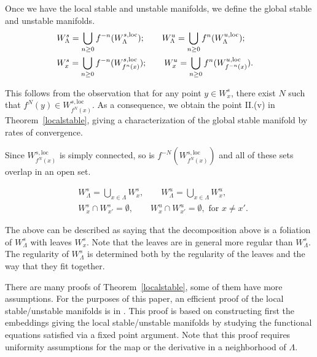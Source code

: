 \documentclass[11pt]{amsart}
\theoremstyle{definition}
\theoremstyle{remark}
\numberwithin{equation}{section}
\begin{document}
Once  we have the local stable and unstable manifolds,
we define the global stable and unstable manifolds.
\[
\begin{split}
  &W^s_\Lambda = \bigcup_{n \ge 0}  f^{-n}(W^{s,\textrm{loc}}_\Lambda);  \qquad
  W^u_\Lambda = \bigcup_{n \ge 0}  f^{n}(W^{u,\textrm{loc}}_\Lambda);  \qquad \\
  &W^s_x  = \bigcup_{n \ge 0}  f^{-n}(W^{s,\rm{\textrm{loc}}}_{f^n(x)});  \qquad
  W^u_x  = \bigcup_{n \ge 0}  f^{n}(W^{u,\rm{\textrm{loc}}}_{f^{-n}(x)}).
\end{split}
\]

This follows from the observation
that for any point $y \in W^s_x$, there exist $N$ such
that
$f^N(y) \in W^{s, \textrm{loc}}_{f^N (x)}$.
As a consequence, we obtain the point II.(v) in
Theorem~\ref{localstable}, giving a characterization
of the global stable manifold by rates of convergence.



Since $W^{s, \textrm{loc}}_{f^N(x)}$
is simply connected, so is $f^{-N}(W^{s, \textrm{loc}}_{f^N(x)} )$
and all of these sets overlap in an open set.



\[
\begin{split}
  &W^s_\Lambda = \bigcup_{x\in\Lambda}   W^{s}_x,  \qquad
  W^u_\Lambda = \bigcup_{x\in\Lambda}   W^{u}_x, \qquad \\
  &W^s_x\cap W^s_{x'}=\emptyset ,  \qquad
  W^u_x\cap W^u_{x'}=\emptyset , \textrm{ for } x\neq x'.
\end{split}
\]



The above can be described as saying that the
decomposition above is a foliation of $W^s_\Lambda$
with leaves $W^s_x$. Note that the leaves are in general
more regular than $W^s_\Lambda$.
The regularity of $W^s_\Lambda$ is determined both
by the regularity of the leaves and the way that they fit together.

There are many proofs of Theorem~\ref{localstable}, some of them
have more assumptions. For the purposes of this paper,
an efficient proof of the local stable/unstable manifolds
is in \cite[p. 33--38]{Pesin}. This proof is based on
constructing first the embeddings giving the local stable/unstable manifolds
by studying the functional equations satisfied via a fixed
point argument.
Note that this proof requires uniformity assumptions
for the map or the derivative in a neighborhood of $\Lambda$.
\end{document}
